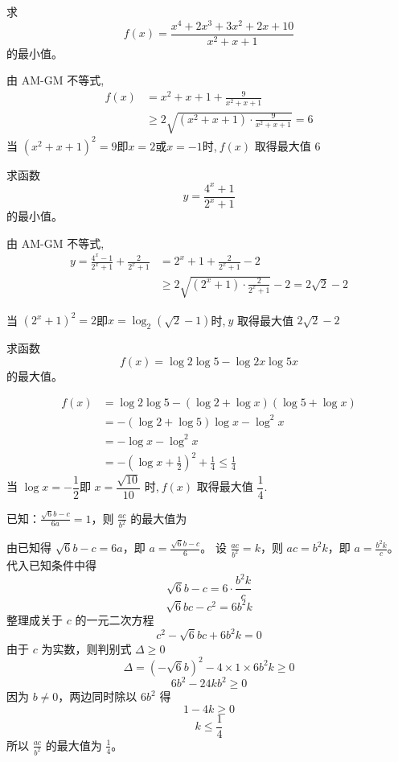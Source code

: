 \begin{questions}
    \question 求
    \[
    f(x)=\frac{x^4 + 2x^3 + 3x^2 + 2x + 10}{x^2 + x + 1}
    \]
    的最小值。
    \begin{solution}
        由 AM-GM 不等式,
        \begin{align*}
        f(x)&=x^2 + x + 1 + \frac{9}{x^2 + x + 1} \\
        &\geq 2 \sqrt{(x^2 + x + 1)\cdot  \frac{9}{x^2 + x + 1}}  =6
        \end{align*}
        当 $(x^2 + x + 1)^2=9$即$x=2$或$x=-1$时,$\ f(x)$ 取得最大值 $6$
    \end{solution}

    \question 求函数 $$y=\frac{4^{x}+1}{2^{x}+1}$$ 的最小值。
    \begin{solution}
        由 AM-GM 不等式,
        \begin{align*}
        y=\frac{4^{x}-1}{2^{x}+1}+\frac{2}{2^{x}+1}
        &=2^{x}+1+\frac{2}{2^{x}+1}-2\\
        &\ge2\sqrt{(2^{x}+1)\cdot\frac{2}{2^{x}+1}}-2=2\sqrt{2}-2
        \end{align*}

        当 $(2^x+1)^2=2$即$x=\log_{2}(\sqrt2-1)$时,$\ y$ 取得最大值 $2\sqrt{2}-2$
    \end{solution}
    
    \question 求函数 $$f(x)=\log 2 \log 5-\log 2x \log 5x$$ 的最大值。 
    \begin{solution}
        \begin{align*}
            f(x)&=\log 2\log 5-(\log 2+\log x)(\log 5+\log x)\\
            &=-(\log 2 + \log 5)\log x - \log^2 x \\
            &=-\log x - \log^2 x \\
            &=-\left(\log x + \frac{1}{2}\right)^2 + \frac{1}{4} \le \frac{1}{4}
        \end{align*}
        当 $\log x = -\dfrac{1}{2}$即 $x=\dfrac{\sqrt{10}}{10}$ 时,$\ f(x)$ 取得最大值 $\dfrac{1}{4}$.
    \end{solution}

    \question
已知：$\frac{\sqrt{6}b - c}{6a} = 1$，则 $\frac{ac}{b^2}$ 的最大值为

\begin{solution}
由已知得 $\sqrt{6}b - c = 6a$，即 $a = \frac{\sqrt{6}b - c}{6}$。
设 $\frac{ac}{b^2} = k$，则 $ac = b^2k$，即 $a = \frac{b^2k}{c}$。
代入已知条件中得
\[
\sqrt{6}b - c = 6 \cdot \frac{b^2k}{c}
\]
\[
\sqrt{6}bc - c^2 = 6b^2k
\]
整理成关于 $c$ 的一元二次方程
\[
c^2 - \sqrt{6}bc + 6b^2k = 0
\]
由于 $c$ 为实数，则判别式 $\Delta \ge 0$
\[
\Delta = (-\sqrt{6}b)^2 - 4 \times 1 \times 6b^2k \ge 0
\]
\[
6b^2 - 24kb^2 \ge 0
\]
因为 $b \neq 0$，两边同时除以 $6b^2$ 得
\[
1 - 4k \ge 0
\]
\[
k \le \frac{1}{4}
\]
所以 $\frac{ac}{b^2}$ 的最大值为 $\frac{1}{4}$。
\end{solution}


\end{questions}
